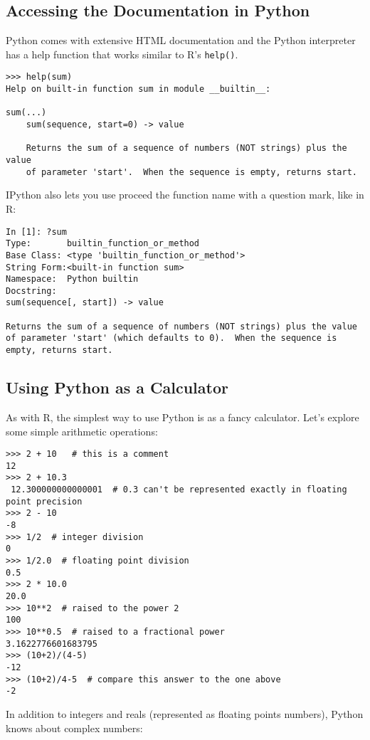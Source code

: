 \documentclass{article}
\begin{document}
\subsection{Accessing the Documentation in Python}

Python comes with extensive HTML documentation and the Python
interpreter has a help function that works similar to R's
\lstinline!help()!.

\begin{lstlisting}
>>> help(sum)
Help on built-in function sum in module __builtin__:

sum(...)
    sum(sequence, start=0) -> value

    Returns the sum of a sequence of numbers (NOT strings) plus the value
    of parameter 'start'.  When the sequence is empty, returns start.
\end{lstlisting}
IPython also lets you use proceed the function name with a question
mark, like in R:

\begin{lstlisting}
In [1]: ?sum
Type:       builtin_function_or_method
Base Class: <type 'builtin_function_or_method'>
String Form:<built-in function sum>
Namespace:  Python builtin
Docstring:
sum(sequence[, start]) -> value

Returns the sum of a sequence of numbers (NOT strings) plus the value
of parameter 'start' (which defaults to 0).  When the sequence is
empty, returns start.
\end{lstlisting}
\subsection{Using Python as a Calculator}

As with R, the simplest way to use Python is as a fancy calculator.
Let's explore some simple arithmetic operations:

\begin{lstlisting}
>>> 2 + 10   # this is a comment
12
>>> 2 + 10.3
 12.300000000000001  # 0.3 can't be represented exactly in floating point precision
>>> 2 - 10
-8
>>> 1/2  # integer division
0
>>> 1/2.0  # floating point division
0.5
>>> 2 * 10.0
20.0
>>> 10**2  # raised to the power 2
100
>>> 10**0.5  # raised to a fractional power
3.1622776601683795
>>> (10+2)/(4-5)
-12
>>> (10+2)/4-5  # compare this answer to the one above 
-2
\end{lstlisting}
In addition to integers and reals (represented as floating points
numbers), Python knows about complex numbers:
\end{document}
